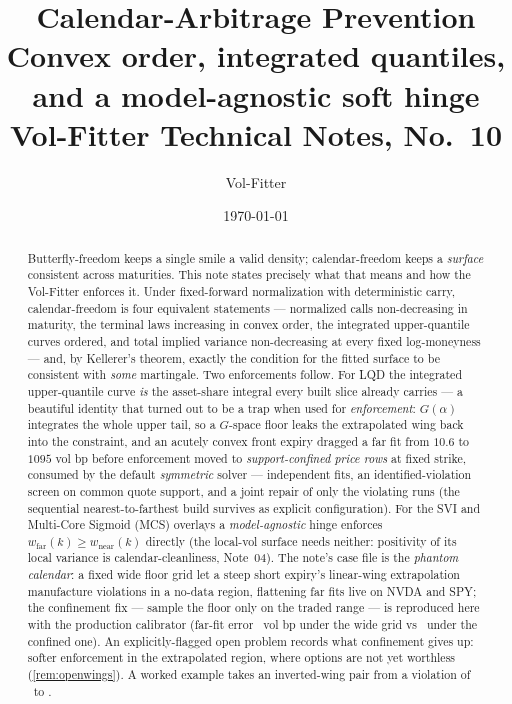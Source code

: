 \documentclass[11pt]{article}
\title{\textbf{Calendar-Arbitrage Prevention}\\[2pt]
\large Convex order, integrated quantiles, and a model-agnostic soft hinge\\[2pt]
\normalsize Vol-Fitter Technical Notes, No.~10}
\author{Vol-Fitter}
\date{\today}
\begin{document}
\maketitle


\begin{abstract}
Butterfly-freedom keeps a single smile a valid density; calendar-freedom
keeps a \emph{surface} consistent across maturities. This note states
precisely what that means and how the Vol-Fitter enforces it. Under
fixed-forward normalization with deterministic carry, calendar-freedom is
four equivalent statements --- normalized calls non-decreasing in maturity,
the terminal laws increasing in convex order, the integrated upper-quantile
curves ordered, and total implied variance non-decreasing at every fixed
log-moneyness --- and, by Kellerer's theorem, exactly the condition for the
fitted surface to be consistent with \emph{some} martingale. Two
enforcements follow. For LQD the integrated upper-quantile curve \emph{is}
the asset-share integral every built slice already carries --- a beautiful
identity that turned out to be a trap when used for \emph{enforcement}:
$G(\alpha)$ integrates the whole upper tail, so a $G$-space floor leaks the
extrapolated wing back into the constraint, and an acutely convex front
expiry dragged a far fit from $10.6$ to $1095$ vol bp before enforcement
moved to \emph{support-confined price rows} at fixed strike, consumed by
the default \emph{symmetric} solver --- independent fits, an
identified-violation screen on common quote support, and a joint repair of
only the violating runs (the sequential nearest-to-farthest build survives
as explicit configuration). For the SVI and Multi-Core Sigmoid
(MCS) overlays a \emph{model-agnostic} hinge enforces
$w_{\text{far}}(k)\ge w_{\text{near}}(k)$ directly (the local-vol surface
needs neither: positivity of its local variance is calendar-cleanliness,
Note~04). The note's case file is the \emph{phantom calendar}: a fixed wide
floor grid let a steep short expiry's linear-wing extrapolation manufacture
violations in a no-data region, flattening far fits live on NVDA and SPY;
the confinement fix --- sample the floor only on the traded range --- is
reproduced here with the production calibrator (far-fit error
\calphantomwide\ vol bp under the wide grid vs \calphantomdata\ under the
confined one). An explicitly-flagged open problem records what confinement
gives up: softer enforcement in the extrapolated region, where options are
not yet worthless (\cref{rem:openwings}). A worked example takes an
inverted-wing pair from a violation of \calviolfree\ to \calviolcured.
\end{abstract}
\end{document}
